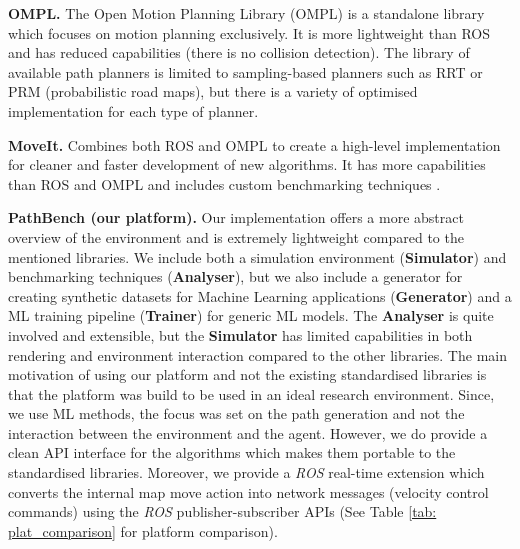 \textbf{OMPL.} The Open Motion Planning Library (OMPL) is a standalone library which focuses on motion planning exclusively. It is more lightweight than ROS and has reduced capabilities (there is no collision detection). The library of available path planners is limited to sampling-based planners such as RRT or PRM (probabilistic road maps), but there is a variety of optimised implementation for each type of planner.

\textbf{MoveIt.} Combines both ROS and OMPL to create a high-level implementation for cleaner and faster development of new algorithms. It has more capabilities than ROS and OMPL and includes custom benchmarking techniques \cite{moll2015benchmarking}.

\textbf{PathBench (our platform).} Our implementation offers a more abstract overview of the environment and is extremely lightweight compared to the mentioned libraries. We include both a simulation environment (\textbf{Simulator}) and benchmarking techniques (\textbf{Analyser}), but we also include a generator for creating synthetic datasets for Machine Learning applications (\textbf{Generator}) and a ML training pipeline (\textbf{Trainer}) for generic ML models. The \textbf{Analyser} is quite involved and extensible, but the \textbf{Simulator} has limited capabilities in both rendering and environment interaction compared to the other libraries. The main motivation of using our platform and not the existing standardised libraries is that the platform was build to be used in an ideal research environment. Since, we use ML methods, the focus was set on the path generation and not the interaction between the environment and the agent. However, we do provide a clean API interface for the algorithms which makes them portable to the standardised libraries. Moreover, we provide a \textit{ROS} real-time extension which converts the internal map move action into network messages (velocity control commands) using the \textit{ROS} publisher-subscriber APIs (See Table \ref{tab: plat_comparison} for platform comparison).


